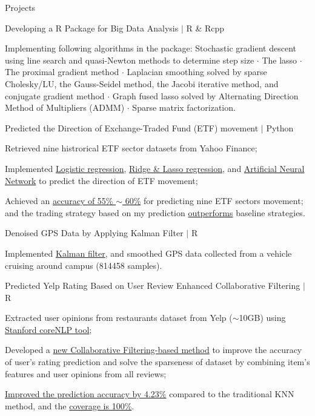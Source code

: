 \documentclass{my_resume} %
\begin{document}

\begin{rSection}{Projects}

  \begin {rSubsection}{Developing a R Package for Big Data Analysis $|$ R \&
    Rcpp}{}{}
  \item Implementing following algorithms in the package: Stochastic gradient
    descent using line search and quasi-Newton methods to determine step size
    {$\cdot$} The lasso {$\cdot$} The proximal gradient method {$\cdot$}
    Laplacian smoothing solved by sparse Cholesky/LU, the Gauss-Seidel method,
    the Jacobi iterative method, and conjugate gradient method {$\cdot$} Graph
    fused lasso solved by Alternating Direction Method of Multipliers (ADMM)
    {$\cdot$} Sparse matrix factorization.
  \end{rSubsection}

  \begin{rSubsection}{Predicted the Direction of Exchange-Traded Fund
    (ETF) movement $|$ Python}{}{}
  \item Retrieved nine histrorical ETF sector datasets from Yahoo Finance;
  \item Implemented \underline{Logistic regression}, \underline{Ridge \& Lasso
    regression}, and \underline{Artificial Neural Network} to predict the
    direction of ETF movement;
  \item Achieved an \underline{accuracy of 55\% $\sim$ 60\%} for predicting
    nine ETF sectors movement; and the trading strategy based on my prediction
    \underline{outperforms} baseline strategies.
  \end{rSubsection}

  \begin{rSubsection}{Denoised GPS Data by Applying Kalman Filter $|$ R}{}{}
  \item Implemented \underline{Kalman filter}, and smoothed GPS data collected from
    a vehicle cruising around campus (814458 samples).
  \end{rSubsection}

  \begin{rSubsection}{Predicted Yelp Rating Based on User Review Enhanced
    Collaborative Filtering $|$ R}{}{}
  \item Extracted user opinions from restaurants dataset from Yelp ($\sim$10GB)
    using \underline{Stanford coreNLP tool};
  \item Developed a \underline{new Collaborative Filtering-based method} to
    improve the accuracy of user's rating prediction and solve the sparseness
    of dataset by combining item's features and user opinions from all reviews;
  \item \underline{Improved the prediction accuracy by 4.23\%} compared to the
    traditional KNN method, and the \underline{coverage is 100\%}.
  \end{rSubsection}


\end{rSection}
\end{document}
